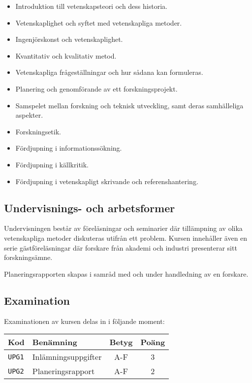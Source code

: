 \begin{itemize}
\tightlist
\item
  Introduktion till vetenskapsteori och dess historia.
\item
  Vetenskaplighet och syftet med vetenskapliga metoder.
\item
  Ingenjörskonst och vetenskaplighet.
\item
  Kvantitativ och kvalitativ metod.
\item
  Vetenskapliga frågeställningar och hur sådana kan formuleras.
\item
  Planering och genomförande av ett forskningsprojekt.
\item
  Samspelet mellan forskning och teknisk utveckling, samt deras
  samhälleliga aspekter.
\item
  Forskningsetik.
\item
  Fördjupning i informationssökning.
\item
  Fördjupning i källkritik.
\item
  Fördjupning i vetenskapligt skrivande och referenshantering.
\end{itemize}

\subsection*{Undervisnings- och
arbetsformer}

Undervisningen består av föreläsningar och seminarier där tillämpning av
olika vetenskapliga metoder diskuteras utifrån ett problem. Kursen
innehåller även en serie gästföreläsningar där forskare från akademi och
industri presenterar sitt forskningsämne.

Planeringsrapporten skapas i samråd med och under handledning av en
forskare.

\subsection*{Examination}

Examinationen av kursen delas in i följande moment:

\begin{longtable}[]{@{}llcc@{}}
\toprule
\textsf{Kod} & \textsf{Benämning} & \textsf{Betyg} & \textsf{Poäng}\tabularnewline
\midrule
\endhead
\texttt{UPG1} & Inlämningsuppgifter & A-F & 3\tabularnewline
\texttt{UPG2} & Planeringsrapport & A-F & 2\tabularnewline
\bottomrule
\end{longtable}

